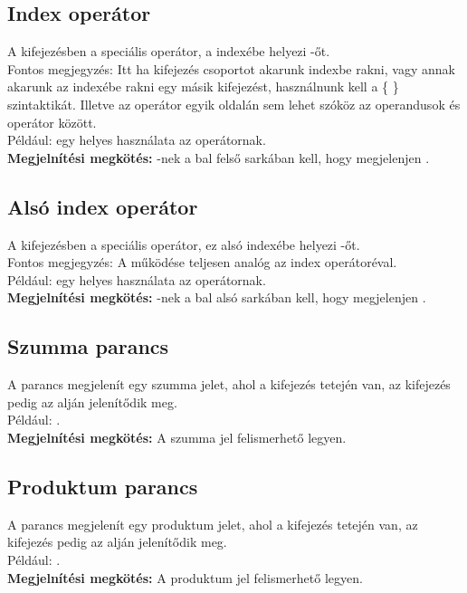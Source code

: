 \documentclass[../spec.tex]{subfiles}
\begin{document}
    \subsection{Index operátor}\label{subsec:index-op}
    A \lang{[kif1]\tc [kif2]} kifejezésben a speciális \lang{\tc} operátor, a \lang{[kif1]} indexébe helyezi -őt.\\
    Fontos megjegyzés: Itt ha kifejezés csoportot akarunk indexbe rakni, vagy annak akarunk az indexébe rakni egy másik kifejezést, használnunk kell a \{ \} szintaktikát.
    Illetve az operátor egyik oldalán sem lehet szóköz az operandusok és operátor között.\\
    Például:  egy helyes használata az operátornak.\\
    \textbf{Megjelnítési megkötés:} \lang{[kif1]} -nek a bal felső sarkában kell, hogy megjelenjen \lang{[kif2]}.

    \subsection{Alsó index operátor}\label{subsec:subscript-op}
    A \lang{[kif1]\_ [kif2]} kifejezésben a speciális \lang{\_ } operátor, ez \lang{[kif1]} alsó indexébe helyezi -őt.\\
    Fontos megjegyzés: A működése teljesen analóg az index operátoréval.\\
    Például:  egy helyes használata az operátornak.\\
    \textbf{Megjelnítési megkötés:} \lang{[kif1]} -nek a bal alsó sarkában kell, hogy megjelenjen \lang{[kif2]}.

    \subsection{Szumma parancs}\label{subsec:szumma-parancs}
    A  parancs megjelenít egy szumma jelet, ahol a  kifejezés tetején van, az  kifejezés pedig az alján jelenítődik meg.\\
    Például: .\\
    \textbf{Megjelnítési megkötés:} A szumma jel felismerhető legyen.

    \subsection{Produktum parancs}\label{subsec:prod-parancs}
    A  parancs megjelenít egy produktum jelet, ahol a  kifejezés tetején van, az  kifejezés pedig az alján jelenítődik meg.\\
    Például: .\\
    \textbf{Megjelnítési megkötés:} A produktum jel felismerhető legyen.
\end{document}
